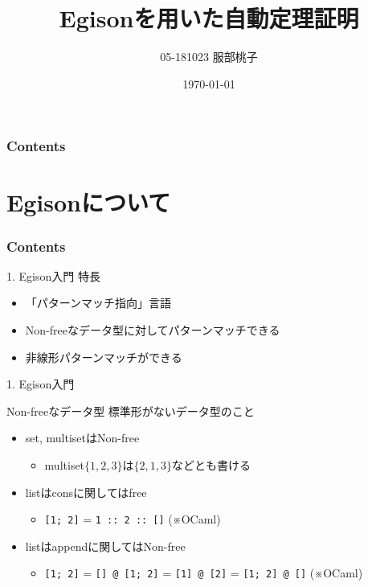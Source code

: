 \documentclass[dvipdfmx,11pt,notheorems]{beamer}
\title[Egison]{Egisonを用いた自動定理証明}%
\author[]{05-181023 服部桃子}%
\date{\today}%
\theoremstyle{definition}
\newcommand{\code}[1]{\texttt{#1}}
\begin{document}
\begin{frame}[plain]\frametitle{}
\titlepage %
\end{frame}

\begin{frame}\frametitle{Contents}
\tableofcontents %
\end{frame}

\section{Egisonについて}
\begin{frame}\frametitle{Contents}
\tableofcontents[currentsection]
\end{frame}

\begin{frame}[fragile]{1. Egison入門}
  特長
  \begin{itemize}
    \item 「パターンマッチ指向」言語
    \item Non-freeなデータ型に対してパターンマッチできる
    \item 非線形パターンマッチができる
  \end{itemize}
\end{frame}

\begin{frame}[fragile]{1. Egison入門}
  \begin{block}{Non-freeなデータ型}
    標準形がないデータ型のこと
    \begin{itemize}
      \item set, multisetはNon-free
      \begin{itemize}
        \item multiset$\{1, 2, 3\}$は$\{2, 1, 3\}$などとも書ける
      \end{itemize}
      \item listはconsに関してはfree
      \begin{itemize}
        \item \code{[1; 2]} = \code{1 :: 2 :: []} \hspace{10pt} {\scriptsize (※OCaml)}
      \end{itemize}
      \item listはappendに関してはNon-free
      \begin{itemize}
        \item \code{[1; 2]} = \code{[] @ [1; 2]} = \code{[1] @ [2]} = \code{[1; 2] @ []}  \hspace{10pt} {\scriptsize (※OCaml)}
      \end{itemize}
    \end{itemize}
  \end{block}
\end{frame}
\end{document}
